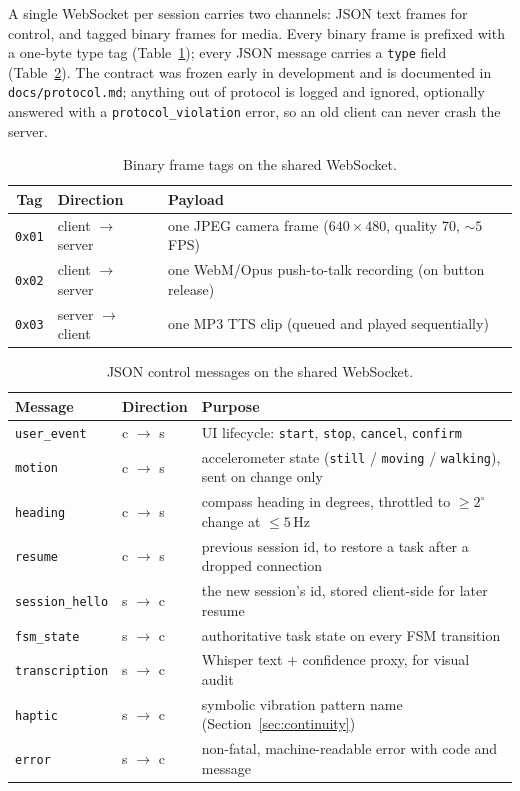 A single WebSocket per session carries two channels: JSON text frames for control,
and tagged binary frames for media. Every binary frame is prefixed with a one-byte
type tag (Table~\ref{tab:bintags}); every JSON message carries a \texttt{type}
field (Table~\ref{tab:jsonmsgs}). The contract was frozen early in development and
is documented in \texttt{docs/protocol.md}; anything out of protocol is logged and
ignored, optionally answered with a \texttt{protocol\_violation} error, so an
old client can never crash the server.

\begin{table}[!htbp]
\centering
\caption[Binary frame tags]{Binary frame tags on the shared WebSocket.}
\label{tab:bintags}
\small
\begin{tabular}{c l p{7.6cm}}
\toprule
\textbf{Tag} & \textbf{Direction} & \textbf{Payload} \\
\midrule
\texttt{0x01} & client $\to$ server & one JPEG camera frame ($640\times480$, quality 70, ${\sim}5$\,FPS) \\
\texttt{0x02} & client $\to$ server & one WebM/Opus push-to-talk recording (on button release) \\
\texttt{0x03} & server $\to$ client & one MP3 TTS clip (queued and played sequentially) \\
\bottomrule
\end{tabular}
\end{table}

\begin{table}[!htbp]
\centering
\caption[JSON control messages]{JSON control messages on the shared WebSocket.}
\label{tab:jsonmsgs}
\small
\begin{tabular}{l l p{7.4cm}}
\toprule
\textbf{Message} & \textbf{Direction} & \textbf{Purpose} \\
\midrule
\texttt{user\_event}    & c $\to$ s & UI lifecycle: \texttt{start}, \texttt{stop}, \texttt{cancel}, \texttt{confirm} \\
\texttt{motion}         & c $\to$ s & accelerometer state (\texttt{still} / \texttt{moving} / \texttt{walking}), sent on change only \\
\texttt{heading}        & c $\to$ s & compass heading in degrees, throttled to ${\geq}2^\circ$ change at ${\leq}5$\,Hz \\
\texttt{resume}         & c $\to$ s & previous session id, to restore a task after a dropped connection \\
\texttt{session\_hello} & s $\to$ c & the new session's id, stored client-side for later resume \\
\texttt{fsm\_state}     & s $\to$ c & authoritative task state on every FSM transition \\
\texttt{transcription}  & s $\to$ c & Whisper text + confidence proxy, for visual audit \\
\texttt{haptic}         & s $\to$ c & symbolic vibration pattern name (Section~\ref{sec:continuity}) \\
\texttt{error}          & s $\to$ c & non-fatal, machine-readable error with code and message \\
\bottomrule
\end{tabular}
\end{table}

